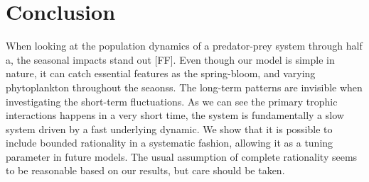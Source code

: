 \section*{Conclusion} %
When looking at the population dynamics of a predator-prey system through half a, the seasonal impacts stand out [FF]. Even though our model is simple in nature, it can catch essential features as the spring-bloom, and varying phytoplankton throughout the seaonss.  The long-term patterns are invisible when investigating the short-term fluctuations. As we can see the primary trophic interactions happens in a very short time, the system is fundamentally a slow system driven by a fast underlying dynamic.
We show that it is possible to include bounded rationality in a systematic fashion, allowing it as a tuning parameter in future models. The usual assumption of complete rationality seems to be reasonable based on our results, but care should be taken.

